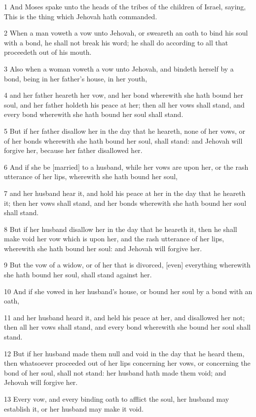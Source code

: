 \par 1 And Moses spake unto the heads of the tribes of the children of Israel, saying, This is the thing which Jehovah hath commanded.
\par 2 When a man voweth a vow unto Jehovah, or sweareth an oath to bind his soul with a bond, he shall not break his word; he shall do according to all that proceedeth out of his mouth.
\par 3 Also when a woman voweth a vow unto Jehovah, and bindeth herself by a bond, being in her father's house, in her youth,
\par 4 and her father heareth her vow, and her bond wherewith she hath bound her soul, and her father holdeth his peace at her; then all her vows shall stand, and every bond wherewith she hath bound her soul shall stand.
\par 5 But if her father disallow her in the day that he heareth, none of her vows, or of her bonds wherewith she hath bound her soul, shall stand: and Jehovah will forgive her, because her father disallowed her.
\par 6 And if she be [married] to a husband, while her vows are upon her, or the rash utterance of her lips, wherewith she hath bound her soul,
\par 7 and her husband hear it, and hold his peace at her in the day that he heareth it; then her vows shall stand, and her bonds wherewith she hath bound her soul shall stand.
\par 8 But if her husband disallow her in the day that he heareth it, then he shall make void her vow which is upon her, and the rash utterance of her lips, wherewith she hath bound her soul: and Jehovah will forgive her.
\par 9 But the vow of a widow, or of her that is divorced, [even] everything wherewith she hath bound her soul, shall stand against her.
\par 10 And if she vowed in her husband's house, or bound her soul by a bond with an oath,
\par 11 and her husband heard it, and held his peace at her, and disallowed her not; then all her vows shall stand, and every bond wherewith she bound her soul shall stand.
\par 12 But if her husband made them null and void in the day that he heard them, then whatsoever proceeded out of her lips concerning her vows, or concerning the bond of her soul, shall not stand: her husband hath made them void; and Jehovah will forgive her.
\par 13 Every vow, and every binding oath to afflict the soul, her husband may establish it, or her husband may make it void.
